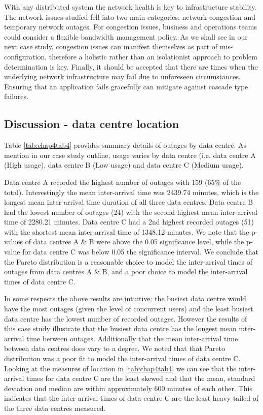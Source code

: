 With any distributed system the network health is key to infrastructure stability. The network issues studied fell into two main categories: network congestion and temporary network outages. For congestion issues, business and operations teams could consider a flexible bandwidth management policy. As we shall see in our next case study, congestion issues can manifest themselves as part of mis-configuration, therefore a holistic rather than an isolationist approach to problem determination is key. Finally, it should be accepted that there are times when the underlying network infrastructure may fail due to unforeseen circumstances. Ensuring that an application fails gracefully can mitigate against cascade type failures.

\subsection{Discussion - data centre location}

Table \ref{tab:chap4tab4} provides summary details of outages by data centre. As mention in our case study outline, usage varies by data centre (i.e. data centre A (High usage), data centre B (Low usage) and data centre C (Medium usage).

Data centre A recorded the highest number of outages with 159 (65\% of the total). Interestingly the mean inter-arrival time was 2439.74 minutes, which is the longest mean inter-arrival time duration of all three data centres. Data centre B had the lowest number of outages (24) with the second highest mean inter-arrival time of 2280.21 minutes. Data centre C had a 2nd highest recorded outages (51) with the shortest mean inter-arrival time of 1348.12 minutes. We note that the p-values of data centres A \& B were above the 0.05 significance level, while the p-value for data centre C was below 0.05 the significance interval. We conclude that the Pareto distribution is a reasonable choice to model the inter-arrival times of outages from data centres A \& B, and a poor choice to model the inter-arrival times of data centre C.

In some respects the above results are intuitive: the busiest data centre would have the most outages (given the level of concurrent users) and the least busiest data centre has the lowest number of recorded outages. However the results of this case study illustrate that the busiest data centre has the longest mean inter-arrival time between outages. Additionally that the mean inter-arrival time between data centres does vary to a degree. We noted that that Pareto distribution was a poor fit to model the inter-arrival times of data centre C. Looking at the measures of location in \ref{tab:chap4tab4} we can see that the inter-arrival times for data centre C are the least skewed and that the mean, standard deviation and median are within approximately 600 minutes of each other. This indicates that the inter-arrival times of data centre C are the least heavy-tailed of the three data centres measured.


